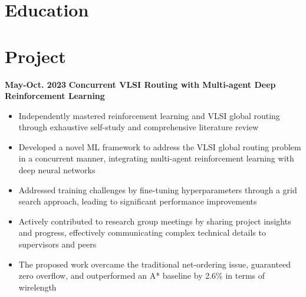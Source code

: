 \documentclass[11pt,a4paper,sans]{moderncv}
\begin{document}
\makecvtitle

\section{Education}

\section{Project}

\cventry
{\textnormal{\textbf{May-Oct. 2023}}}
{\textnormal{\textbf{Concurrent VLSI Routing with Multi-agent
Deep Reinforcement Learning}}}
{}{}{}
{
    \begin{itemize}
        \item Independently mastered reinforcement learning and VLSI global routing through exhaustive self-study and comprehensive literature review
        \item Developed a novel ML framework to address the VLSI global routing problem in a concurrent manner, integrating multi-agent reinforcement learning with deep neural networks
        \item Addressed training challenges by fine-tuning hyperparameters through a grid search approach, leading to significant performance improvements
        \item Actively contributed to research group meetings by sharing project insights and progress, effectively communicating complex technical details to supervisors and peers
        \item The proposed work overcame the traditional net-ordering issue, guaranteed zero overflow, and outperformed an A* baseline by 2.6\% in terms of wirelength
        \end{itemize}
}
\end{document}
